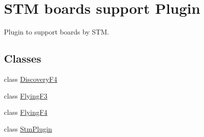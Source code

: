 \hypertarget{group___boards___stm}{\section{S\-T\-M boards support Plugin}
\label{group___boards___stm}
}


Plugin to support boards by S\-T\-M.  


\subsection*{Classes}
\begin{DoxyCompactItemize}
\item 
class \hyperlink{class_discovery_f4}{Discovery\-F4}
\item 
class \hyperlink{class_flying_f3}{Flying\-F3}
\item 
class \hyperlink{class_flying_f4}{Flying\-F4}
\item 
class \hyperlink{class_stm_plugin}{Stm\-Plugin}
\end{DoxyCompactItemize}
